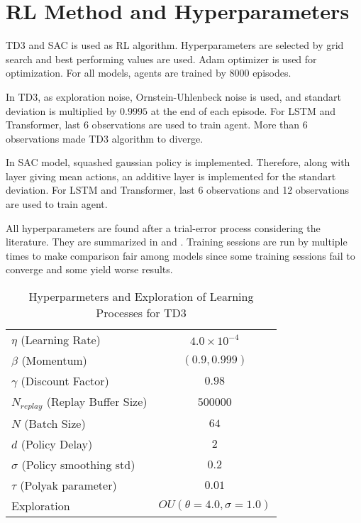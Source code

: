\section{RL Method and Hyperparameters}
\label{sec:rlmethod}

TD3 and SAC is used as RL algorithm. 
Hyperparameters are selected by grid search and best performing values are used. Adam optimizer is used for optimization. 
For all models, agents are trained by 8000 episodes.

In TD3, as exploration noise, Ornstein-Uhlenbeck noise is used, and standart deviation is multiplied  by $0.9995$ at the end of each episode. For LSTM and Transformer, last 6 observations are used to train agent. 
More than 6 observations made TD3 algorithm to diverge. 

In SAC model, squashed gaussian policy is implemented. 
Therefore, along with layer giving mean actions, an additive layer is implemented for the standart deviation. 
For LSTM and Transformer, last 6 observations and 12 observations are used to train agent. 

All hyperparameters are found after a trial-error process considering the literature. They  are summarized in  and . 
Training sessions are run by multiple times to make comparison fair among models since some training sessions fail to converge and some yield worse results.

\begin{table}
	\caption{Hyperparmeters and Exploration of Learning Processes for TD3}
	\begin{tabular}{|l||*{3}{c|}}\hline
		\backslashbox{Hyperparameter}{Model}
		&\makebox[5em]{RFFNN}&\makebox[5em]{LSTM}&\makebox[5em]{Transformer}\\\hline\hline
		$\eta$ (Learning Rate) & \multicolumn{3}{|c|}{$4.0\times10^{-4}$}\\\hline
		$\beta$ (Momentum) & \multicolumn{3}{|c|}{$(0.9, 0.999)$}\\\hline
		$\gamma$ (Discount Factor) & \multicolumn{3}{|c|}{$0.98$} \\\hline
		$N_{replay}$ (Replay Buffer Size) &\multicolumn{3}{|c|}{$500000$} \\\hline
		$N$ (Batch Size) &\multicolumn{3}{|c|}{$64$}\\\hline
		$d$ (Policy Delay) &\multicolumn{3}{|c|}{$2$}\\\hline
		$\sigma$ (Policy smoothing std) &\multicolumn{3}{|c|}{$0.2$}\\\hline
		$\tau$ (Polyak parameter) &\multicolumn{3}{|c|}{$0.01$}\\\hline
		Exploration &\multicolumn{3}{|c|}{$OU(\theta=4.0, \sigma=1.0)$}\\\hline
	\end{tabular}
	\label{table:hyperparams_td3}
\end{table}
\noindent

